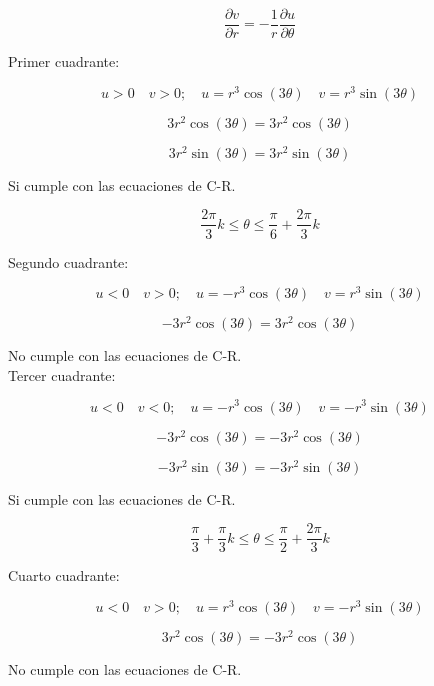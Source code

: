 \documentclass[a4paper,12pt]{article}
\begin{document}
\[
\frac{\partial v}{\partial r} = -\frac{1}{r}\frac{\partial u}{\partial \theta}
\]


Primer cuadrante:

\[
u > 0 \quad v > 0 ; \quad u = r^3 \cos(3\theta) \quad v = r^3 \sin(3\theta)
\]

\[
3r^2 \cos(3\theta) = 3r^2 \cos(3\theta)
\]

\[
3r^2 \sin(3\theta) = 3r^2 \sin(3\theta)
\]

Si cumple con las ecuaciones de C-R.

\[
\frac{2\pi}{3}k \leq \theta \leq \frac{\pi}{6} + \frac{2\pi}{3}k
\]

Segundo cuadrante:

\[
u < 0 \quad v > 0 ; \quad u = -r^3 \cos(3\theta) \quad v = r^3 \sin(3\theta)
\]

\[
-3r^2 \cos(3\theta) = 3r^2 \cos(3\theta)
\]

No cumple con las ecuaciones de C-R.\\

Tercer cuadrante:

\[
u < 0 \quad v < 0 ; \quad u = -r^3 \cos(3\theta) \quad v = -r^3 \sin(3\theta)
\]

\[
-3r^2 \cos(3\theta) = -3r^2 \cos(3\theta)
\]

\[
-3r^2 \sin(3\theta) = -3r^2 \sin(3\theta)
\]

Si cumple con las ecuaciones de C-R.

\[
\frac{\pi}{3} + \frac{\pi}{3}k \leq \theta \leq \frac{\pi}{2} + \frac{2\pi}{3}k
\]

Cuarto cuadrante:

\[
u < 0 \quad v > 0 ; \quad u = r^3 \cos(3\theta) \quad v = -r^3 \sin(3\theta)
\]

\[
3r^2 \cos(3\theta) = -3r^2 \cos(3\theta)
\]

No cumple con las ecuaciones de C-R.

\newpage
\end{document}
